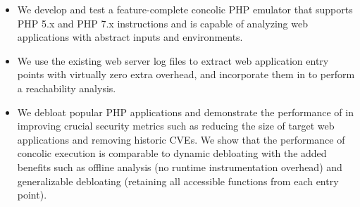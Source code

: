 \begin{itemize}
    \item We develop and test a feature-complete concolic PHP emulator that supports PHP 5.x and PHP 7.x instructions and is capable of analyzing web applications with abstract inputs and environments.
    \item We use the existing web server log files to extract web application entry points with virtually zero extra overhead, and incorporate them in \animatedead{} to perform a reachability analysis. 
    \item We debloat popular PHP applications and demonstrate the performance of \animatedead{} in improving crucial security metrics such as reducing the size of target web applications and removing historic CVEs. 
    We show that the performance of concolic execution is comparable to dynamic debloating with the added benefits such as offline analysis (no runtime instrumentation overhead) and generalizable debloating (retaining all accessible functions from each entry point).
\end{itemize}